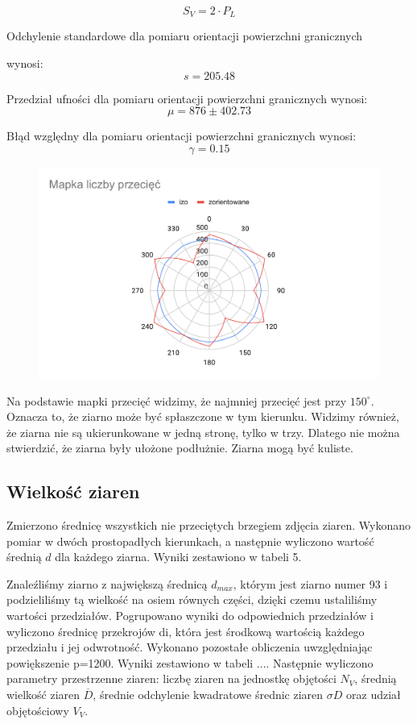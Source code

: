 \documentclass[a4paper,12pt]{article}
\begin{document}
$$S_V= 2\cdot P_L$$



Odchylenie standardowe dla pomiaru orientacji powierzchni granicznych 

wynosi:
$$s=205.48$$

Przedział ufności dla pomiaru orientacji powierzchni granicznych wynosi:
$$\mu = 876\pm 402.73$$

Błąd względny dla pomiaru orientacji powierzchni granicznych wynosi:
$$\gamma = 0.15$$
\newline

\begin{figure}[H]
    \centering
    \includegraphics[width=\textwidth]{img/Mapka liczby przecięć.pdf}
\end{figure}


Na podstawie mapki przecięć widzimy, że najmniej przecięć jest przy $150^{\circ}$. Oznacza to, że ziarno może być spłaszczone w tym kierunku. Widzimy również, że ziarna nie są ukierunkowane w jedną stronę, tylko w trzy. Dlatego nie można stwierdzić, że ziarna były ułożone podłużnie.  
Ziarna mogą być kuliste.

\subsection{Wielkość ziaren}

Zmierzono średnicę wszystkich nie przeciętych brzegiem zdjęcia ziaren. Wykonano pomiar w dwóch prostopadłych kierunkach, a następnie wyliczono wartość średnią $d$ dla każdego ziarna. Wyniki zestawiono w tabeli 5.

Znaleźliśmy ziarno z największą średnicą $d_{max}$, którym jest ziarno numer 93 i podzieliliśmy tą wielkość na osiem równych części, dzięki czemu ustaliliśmy wartości przedziałów. Pogrupowano wyniki do odpowiednich przedziałów i wyliczono średnicę przekrojów di, która jest środkową wartością każdego przedziału i jej odwrotność. Wykonano pozostałe obliczenia uwzględniając powiększenie p=1200. Wyniki zestawiono w tabeli ....
Następnie wyliczono parametry przestrzenne ziaren: liczbę ziaren na jednostkę objętości $N_V$, średnią wielkość ziaren $\overline{D}$, średnie odchylenie kwadratowe średnic ziaren $\sigma D$ oraz udział objętościowy $V_V$.
\end{document}
